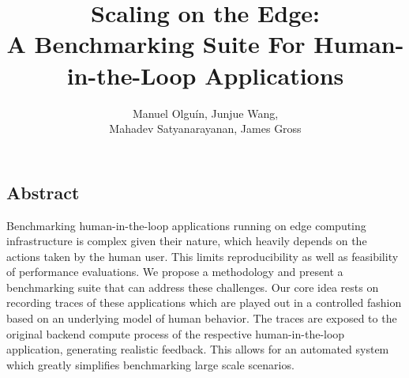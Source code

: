 \documentclass[portrait, a1]{KTHEEposter}
\begin{document}
    
    \title{\LARGE\bfseries Scaling on the Edge:\\A Benchmarking Suite For Human-in-the-Loop Applications}
    
    \author{\Large Manuel Olguín, Junjue Wang,\\Mahadev Satyanarayanan, James Gross}
    \maketitle
    
    \begin{pcolumns}[3]
        \begin{pcolumn}[2]
            \begin{pframe}[.7]
                \section{Abstract}
                Benchmarking human-in-the-loop applications running on edge computing infrastructure is complex given their nature, which heavily depends on the actions taken by the human user.
                This limits reproducibility as well as feasibility of performance evaluations.
                We propose a methodology and present a benchmarking suite that can address these challenges.
                Our core idea rests on recording traces of these applications which are played out in a controlled fashion based on an underlying model of human behavior.
                The traces are exposed to the original backend compute process of the respective human-in-the-loop application, generating realistic feedback.
                This allows for an automated system which greatly simplifies benchmarking large scale scenarios.
            \end{pframe}
            \begin{pframe}[1.3]

\end{pframe}
\end{pcolumn}
\end{pcolumns}
\end{document}
